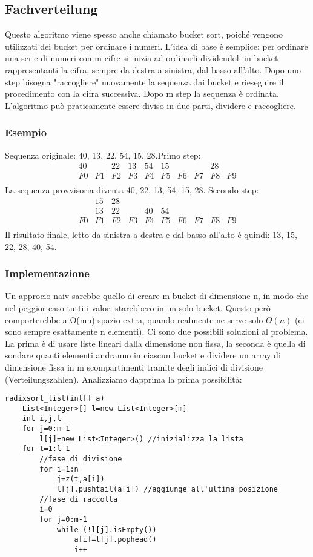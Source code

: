 \documentclass[a4paper]{book}
\begin{document}
\subsection{Fachverteilung}
Questo algoritmo viene spesso anche chiamato bucket sort, poiché vengono utilizzati dei bucket per ordinare i numeri. L'idea di base è semplice: per ordinare una serie di numeri con m cifre si inizia ad ordinarli dividendoli in bucket rappresentanti la cifra, sempre da destra a sinistra, dal basso all'alto. Dopo uno step bisogna "raccogliere" nuovamente la sequenza dai bucket e rieseguire il procedimento con la cifra successiva. Dopo m step la sequenza è ordinata. L'algoritmo può praticamente essere diviso in due parti, dividere e raccogliere.
\subsubsection*{Esempio}
Sequenza originale: 40, 13, 22, 54, 15, 28.Primo step:    
\[\begin{array}{*{20}{c}}
{40}&{ }&{22}&{13}&{54}&{15}&{ }&{ }&{28}&{ }\\
{F0}&{F1}&{F2}&{F3}&{F4}&{F5}&{F6}&{F7}&{F8}&{F9}\\
\end{array}\]
La sequenza provvisoria diventa 40, 22, 13, 54, 15, 28. Secondo step:
\[\begin{array}{*{20}{c}}
{ }&{15}&{28}&{ }&{ }&{ }&{ }&{ }&{ }&{ }\\
{ }&{13}&{22}&{ }&{40}&{54}&{ }&{ }&{ }&{ }\\
{F0}&{F1}&{F2}&{F3}&{F4}&{F5}&{F6}&{F7}&{F8}&{F9}\\
\end{array}\]
Il risultato finale, letto da sinistra a destra e dal basso all'alto è quindi: 13, 15, 22, 28, 40, 54.
\subsubsection*{Implementazione}
Un approcio naiv sarebbe quello di creare m bucket di dimensione n, in modo che nel peggior caso tutti i valori starebbero in un solo bucket. Questo però comporterebbe a O(mn) spazio extra, quando realmente ne serve solo $\Theta (n)$ (ci sono sempre esattamente n elementi). Ci sono due possibili soluzioni al problema. La prima è di usare liste lineari dalla dimensione non fissa, la seconda è quella di sondare quanti elementi andranno in ciascun bucket e dividere un array di dimensione fissa in m scompartimenti tramite degli indici di divisione (Verteilungszahlen). Analizziamo dapprima la prima possibilità:
\begin{lstlisting}
radixsort_list(int[] a)
	List<Integer>[] l=new List<Integer>[m]
	int i,j,t
	for j=0:m-1
		l[j]=new List<Integer>() //inizializza la lista
	for t=1:l-1
		//fase di divisione
		for i=1:n
			j=z(t,a[i])
			l[j].pushtail(a[i]) //aggiunge all'ultima posizione
		//fase di raccolta
		i=0
		for j=0:m-1
			while (!l[j].isEmpty())
				a[i]=l[j].pophead()
				i++
				
\end{lstlisting}
\end{document}
